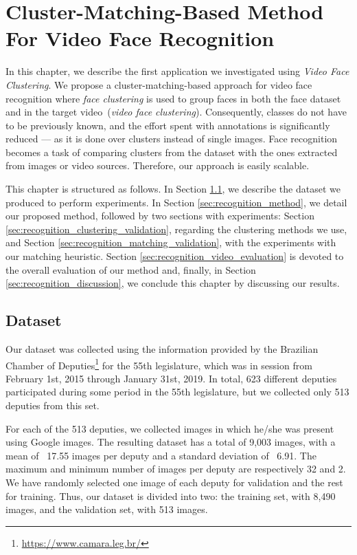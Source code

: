 \newpage
\chapter{Cluster-Matching-Based Method For Video Face Recognition}
\label{chap:face_recognition}

In this chapter, we describe the first application we investigated using \emph{Video Face Clustering}.
We propose a cluster-matching-based approach for video face recognition where \emph{face clustering} is used to group faces in both the face dataset and in the target video~(\emph{video face clustering}).
Consequently, classes do not have to be previously known, and the effort spent with annotations is significantly reduced --- as it is done over clusters instead of single images.
Face recognition becomes a task of comparing clusters from the dataset with the ones extracted from images or video sources.
Therefore, our approach is easily scalable.

This chapter is structured as follows. 
In Section \ref{sec:recognition_dataset}, we describe the dataset we produced to perform experiments. 
In Section \ref{sec:recognition_method}, we detail our proposed method, followed by two sections with experiments: 
Section \ref{sec:recognition_clustering_validation}, regarding the clustering methods we use, and 
Section \ref{sec:recognition_matching_validation}, with the experiments with our matching heuristic.
Section \ref{sec:recognition_video_evaluation} is devoted to the overall evaluation of our method and, finally, 
in Section \ref{sec:recognition_discussion}, we conclude this chapter by discussing our results.

\section{Dataset}
\label{sec:recognition_dataset}
Our dataset was collected using the information provided by the Brazilian Chamber of Deputies\footnote{\url{https://www.camara.leg.br/}} for the 55th legislature, which was in session from February 1st, 2015 through January 31st, 2019.
In total, 623 different deputies participated during some period in the 55th legislature, but we collected only 513 deputies from this set.

For each of the 513 deputies, we collected images in which he/she was present using Google images.
The resulting dataset has a total of 9,003 images, with a mean of ~17.55 images per deputy and a standard deviation of ~6.91. 
The maximum and minimum number of images per deputy are respectively 32 and 2.
We have randomly selected one image of each deputy for validation and the rest for training.
Thus, our dataset is divided into two: the training set, with 8,490 images, and the validation set, with 513 images.  

